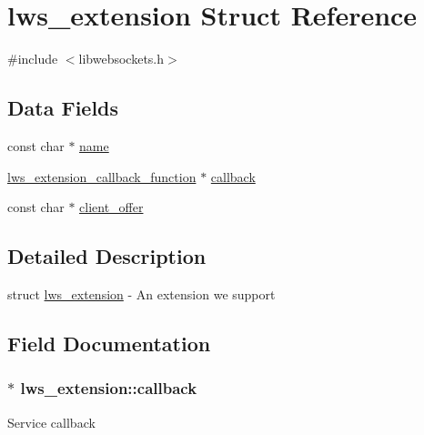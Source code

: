 \hypertarget{structlws__extension}{}\section{lws\+\_\+extension Struct Reference}
\label{structlws__extension}


{\ttfamily \#include $<$libwebsockets.\+h$>$}

\subsection*{Data Fields}
\begin{DoxyCompactItemize}
\item 
const char $\ast$ \hyperlink{structlws__extension_a1e5018c883d85176f5c2152176843f9e}{name}
\item 
\hyperlink{group__extensions_gaae7169b2cd346b34fa33d0250db2afd0}{lws\+\_\+extension\+\_\+callback\+\_\+function} $\ast$ \hyperlink{structlws__extension_afa21f3b3c8c2c9212a276c52b680c3af}{callback}
\item 
const char $\ast$ \hyperlink{structlws__extension_a36b06c213aedb02bf9a402651751855b}{client\+\_\+offer}
\end{DoxyCompactItemize}


\subsection{Detailed Description}
struct \hyperlink{structlws__extension}{lws\+\_\+extension} -\/ An extension we support 

\subsection{Field Documentation}
\subsubsection[{\texorpdfstring{callback}{callback}}]{$\ast$ lws\+\_\+extension\+::callback}\hypertarget{structlws__extension_afa21f3b3c8c2c9212a276c52b680c3af}{}\label{structlws__extension_afa21f3b3c8c2c9212a276c52b680c3af}
Service callback 
